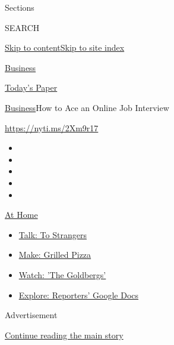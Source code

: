 Sections

SEARCH

\protect\hyperlink{site-content}{Skip to
content}\protect\hyperlink{site-index}{Skip to site index}

\href{https://www.nytimes.com/section/business}{Business}

\href{https://myaccount.nytimes.com/auth/login?response_type=cookie\&client_id=vi}{}

\href{https://www.nytimes.com/section/todayspaper}{Today's Paper}

\href{/section/business}{Business}\textbar{}How to Ace an Online Job
Interview

\url{https://nyti.ms/2Xm9r17}

\begin{itemize}
\item
\item
\item
\item
\item
\end{itemize}

\href{https://www.nytimes.com/spotlight/at-home?action=click\&pgtype=Article\&state=default\&region=TOP_BANNER\&context=at_home_menu}{At
Home}

\begin{itemize}
\tightlist
\item
  \href{https://www.nytimes.com/2020/08/03/well/family/the-benefits-of-talking-to-strangers.html?action=click\&pgtype=Article\&state=default\&region=TOP_BANNER\&context=at_home_menu}{Talk:
  To Strangers}
\item
  \href{https://www.nytimes.com/2020/08/01/at-home/coronavirus-make-pizza-on-a-grill.html?action=click\&pgtype=Article\&state=default\&region=TOP_BANNER\&context=at_home_menu}{Make:
  Grilled Pizza}
\item
  \href{https://www.nytimes.com/2020/07/31/arts/television/goldbergs-abc-stream.html?action=click\&pgtype=Article\&state=default\&region=TOP_BANNER\&context=at_home_menu}{Watch:
  'The Goldbergs'}
\item
  \href{https://www.nytimes.com/interactive/2020/at-home/even-more-reporters-editors-diaries-lists-recommendations.html?action=click\&pgtype=Article\&state=default\&region=TOP_BANNER\&context=at_home_menu}{Explore:
  Reporters' Google Docs}
\end{itemize}

Advertisement

\protect\hyperlink{after-top}{Continue reading the main story}


